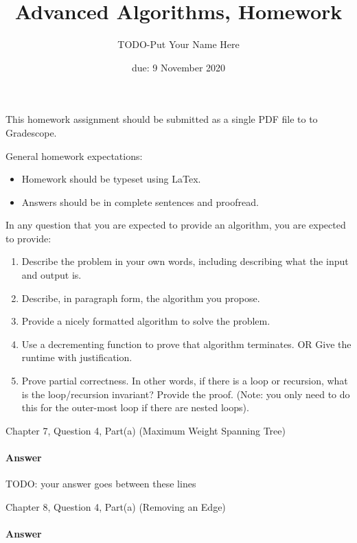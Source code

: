 \documentclass{article}
\title{Advanced Algorithms, Homework \hwnum}
\author{TODO-Put Your Name Here}
\date{due: 9 November 2020}
\begin{document}
\maketitle

This homework assignment should be
submitted as a single PDF file to to Gradescope.

General homework expectations:
\begin{itemize}
    \item Homework should be typeset using LaTex.
    \item Answers should be in complete sentences and proofread.
\end{itemize}

In any question that you are expected to provide an algorithm, you are
expected to provide:
\begin{enumerate}
    \item Describe the problem in your own words, including
        describing what the input and output is.
    \item Describe, in paragraph form, the algorithm you propose.
    \item Provide a nicely formatted algorithm to solve the problem.
    \item Use a decrementing function to prove that algorithm terminates.
            OR  Give the runtime with justification.
    \item Prove partial correctness.  In other words, if there is a loop or
        recursion, what is the loop/recursion invariant? Provide the proof.
        (Note: you only need to do this for the outer-most loop if there are
        nested loops).
\end{enumerate}

\nextprob
{}

Chapter 7, Question 4, Part(a) (Maximum Weight Spanning Tree)

\paragraph{Answer}


TODO: your answer goes between these lines



\nextprob
{}

Chapter 8, Question 4, Part(a) (Removing an Edge)

\paragraph{Answer}
\end{document}
